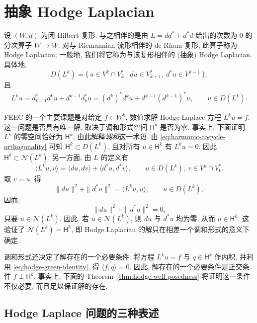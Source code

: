\section{抽象 Hodge Laplacian}\label{sec:abstract-hodge-laplacian}

设 $(W,d)$ 为闭 Hilbert 复形. 与之相伴的是由 $L=dd^*+d^*d$ 给出的次数为 $0$ 的分次算子 $W\to W$. 对与 Riemannian 流形相伴的 de Rham 复形, 此算子称为 Hodge Laplacian; 一般地, 我们将它称为与该复形相伴的 (抽象) Hodge Laplacian. 具体地,
\begin{equation}\label{eq:abstract-hodge-domain}
D(L^k)=\{\,u\in V^k\cap V_k^*\mid du\in V_{k+1}^*,\ d^*u\in V^{k-1}\,\},
\end{equation}
且
\begin{equation}\label{eq:abstract-hodge-operator}
\begin{gathered}
L^k u=d_{k+1}^*d^k u+d^{k-1}d_k^*u=(d^k)^*d^k u+d^{k-1}(d^{k-1})^*u,\qquad u\in D(L^k).
\end{gathered}
\end{equation}

FEEC 的一个主要课题是对给定 $f\in W^k$, 数值求解 Hodge Laplace 方程 $L^k u=f$. 这一问题是否具有唯一解, 取决于调和形式空间 $\mathsf H^k$ 是否为零. 事实上, 下面证明 $L^k$ 的零空间恰好为 $\mathsf H^k$, 由此解释\emph{调和}这一术语. 由 \eqref{eq:harmonic-cocycle-orthogonality} 可知 $\mathsf H^k\subset D(L^k)$, 且对所有 $u\in\mathsf H^k$ 有 $L^k u=0$. 因此 $\mathsf H^k\subset\mathcal N(L^k)$. 另一方面, 由 $L$ 的定义有
\begin{equation}\label{eq:hodge-green-identity}
\langle L^k u,v\rangle=\langle du,dv\rangle+\langle d^*u,d^*v\rangle,\qquad u\in D(L^k),\ v\in V^k\cap V_k^*.
\end{equation}
取 $v=u$, 得
\[
\|du\|^2+\|d^*u\|^2=\langle L^k u,u\rangle,\qquad u\in D(L^k),
\]
因而,
\[
\|du\|^2+\|d^*u\|^2=0,
\]
只要 $u\in\mathcal N(L^k)$. 因此, 若 $u\in\mathcal N(L^k)$, 则 $du$ 与 $d^*u$ 均为零, 从而 $u\in\mathsf H^k$. 这验证了 $\mathcal N(L^k)=\mathsf H^k$, 即 Hodge Laplacian 的解只在相差一个调和形式的意义下确定.

调和形式还决定了解存在的一个必要条件. 将方程 $L^k u=f$ 与 $q\in\mathsf H^k$ 作内积, 并利用 \eqref{eq:hodge-green-identity}, 得 $\langle f,q\rangle=0$. 因此, 解存在的一个必要条件是正交条件 $f\perp\mathsf H^k$. 事实上, 下面的 Theorem~\ref{thm:hodge-well-posedness} 将证明这一条件不仅必要, 而且足以保证解的存在.

\subsection{Hodge Laplace 问题的三种表述}\label{subsec:hodge-three-formulations}

